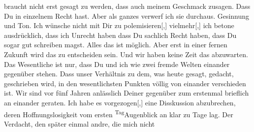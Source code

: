                braucht nicht erst gesagt zu werden, dass auch meinem Geschmack \label{T_L03520-2v}\label{T_L03520-2} zusagen.
               Dass Du in einzelnem Recht hast. Aber als ganzes verwerf ich sie durchaus. Gesinnung
               und Ton. Ich wünsche nicht mit Dir zu polemisieren{[},{]}
                  vielmehr{[},{]} ich betone ausdrücklich, dass ich Unrecht haben
                  \label{T_L03520-3v}\label{T_L03520-3} dass Du
               sachlich Recht
               haben, dass Du sogar gut schreiben magst. Alles das ist möglich. Aber erst in einer
               fernen Zukunft wird das zu entscheiden sein. Und wir haben keine Zeit das abzuwarten.
               Das Wesentliche ist nur, dass Du und ich wie zwei fremde Welten einander gegenüber
               stehen. Dass unser Verhältnis zu dem, was heute gesagt, gedacht, geschrieben wird, in
               den wesentlichsten Punkten völlig von einander verschieden ist. Wir sind vor fünf {\pb}Jahren anlässlich Deiner \label{K_L03520-2v}\label{K_L03520-2}
               gegenüber zum erstenmal brieflich an einander geraten. Ich habe es
                  vorgezogen{[},{]} eine Disskussion abzubrechen, deren
               Hoffnungslosigkeit vom ersten \substVorne{}\textsuperscript{Tag}\substDazwischen{}Augenblick\substHinten{} an klar zu Tage lag. Der Verdacht, den später einmal andre, die mich nicht
